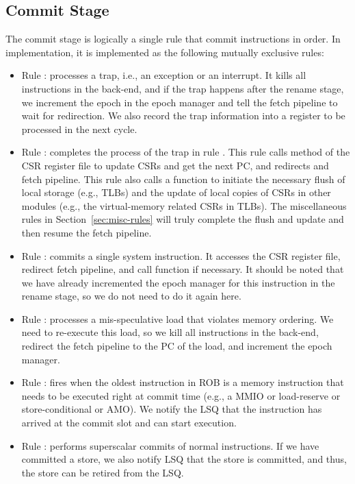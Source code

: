 \subsection{Commit Stage}\label{sec:commit}

The commit stage is logically a single rule that commit instructions in order.
In implementation, it is implemented as the following mutually exclusive rules:
\begin{itemize}
    \item Rule : processes a trap, i.e., an exception or an interrupt.
    It kills all instructions in the back-end, and if the trap happens after the rename stage, we increment the epoch in the epoch manager and tell the fetch pipeline to wait for redirection.
    We also record the trap information into a register to be processed in the next cycle.
    \item Rule : completes the process of the trap in rule .
    This rule calls method  of the CSR register file to update CSRs and get the next PC, and redirects and fetch pipeline.
    This rule also calls a function  to initiate the necessary flush of local storage (e.g., TLBs) and the update of local copies of CSRs in other modules (e.g., the virtual-memory related CSRs in TLBs).
    The miscellaneous rules in Section~\ref{sec:misc-rules} will truly complete the flush and update and then resume the fetch pipeline.
    \item Rule : commits a single system instruction.
    It accesses the CSR register file, redirect fetch pipeline, and call function  if necessary.
    It should be noted that we have already incremented the epoch manager for this instruction in the rename stage, so we do not need to do it again here.
    \item Rule : processes a mis-speculative load that violates memory ordering.
    We need to re-execute this load, so we kill all instructions in the back-end, redirect the fetch pipeline to the PC of the load, and increment the epoch manager.
    \item Rule : fires when the oldest instruction in ROB is a memory instruction that needs to be executed right at commit time (e.g., a MMIO or load-reserve or store-conditional or AMO).
    We notify the LSQ that the instruction has arrived at the commit slot and can start execution.
    \item Rule : performs superscalar commits of normal instructions.
    If we have committed a store, we also notify LSQ that the store is committed, and thus, the store can be retired from the LSQ.
\end{itemize}
